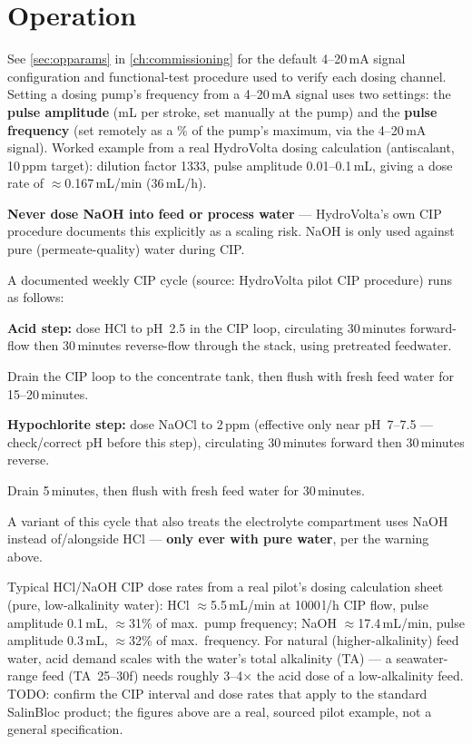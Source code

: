\documentclass[a4paper,11pt,twoside,openright,numbers=noenddot]{scrreprt}
\newcommand{\salinbloc}{SalinBloc\texttrademark\xspace}
\begin{document}
\section{Operation}
See \cref{sec:opparams} in \cref{ch:commissioning} for the default 4--20\,mA
signal configuration and functional-test procedure used to verify each
dosing channel. Setting a dosing pump's frequency from a 4--20\,mA signal
uses two settings: the \textbf{pulse amplitude} (mL per stroke, set
manually at the pump) and the \textbf{pulse frequency} (set remotely as a
\% of the pump's maximum, via the 4--20\,mA signal). Worked example from a
real HydroVolta dosing calculation (antiscalant, 10\,ppm target): dilution
factor 1333, pulse amplitude 0.01--0.1\,mL, giving a dose rate of
$\approx$0.167\,mL/min (36\,mL/h).

\begin{warning}
\textbf{Never dose NaOH into feed or process water} --- HydroVolta's own
CIP procedure documents this explicitly as a scaling risk. NaOH is only
used against pure (permeate-quality) water during CIP.
\end{warning}

A documented weekly CIP cycle (source: HydroVolta pilot CIP procedure)
runs as follows:
\begin{procedure}
\item \textbf{Acid step:} dose HCl to pH~2.5 in the CIP loop, circulating
  30\,minutes forward-flow then 30\,minutes reverse-flow through the
  stack, using pretreated feedwater.
\item Drain the CIP loop to the concentrate tank, then flush with fresh
  feed water for 15--20\,minutes.
\item \textbf{Hypochlorite step:} dose NaOCl to 2\,ppm (effective only
  near pH~7--7.5 --- check/correct pH before this step), circulating
  30\,minutes forward then 30\,minutes reverse.
\item Drain 5\,minutes, then flush with fresh feed water for
  30\,minutes.
\item A variant of this cycle that also treats the electrolyte
  compartment uses NaOH instead of/alongside HCl --- \textbf{only ever
  with pure water}, per the warning above.
\end{procedure}
Typical HCl/NaOH CIP dose rates from a real pilot's dosing calculation
sheet (pure, low-alkalinity water): HCl $\approx$5.5\,mL/min at 1000\,l/h
CIP flow, pulse amplitude 0.1\,mL, $\approx$31\% of max.\ pump frequency;
NaOH $\approx$17.4\,mL/min, pulse amplitude 0.3\,mL, $\approx$32\% of
max.\ frequency. For natural (higher-alkalinity) feed water, acid demand
scales with the water's total alkalinity (TA) --- a seawater-range feed
(TA~25--30\textdegree f) needs roughly 3--4$\times$ the acid dose of a
low-alkalinity feed. TODO: confirm the CIP interval and dose rates that
apply to the standard \salinbloc product; the figures above are a real,
sourced pilot example, not a general specification.
\end{document}

